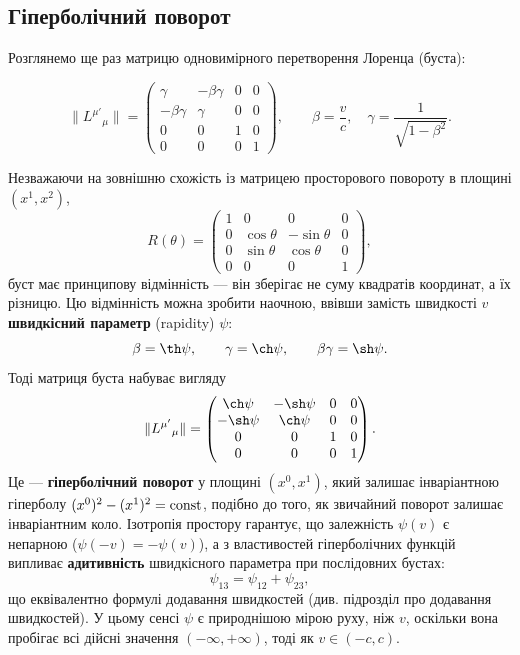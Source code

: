 \documentclass[%
biblatex,
]{ConspectBook}
\begin{document}
\subsection*{Гіперболічний поворот}
Розглянемо ще раз матрицю одновимірного перетворення Лоренца (буста):

\[
\|L^{\mu'}{}_{\mu}\| =
\begin{pmatrix}
\gamma & -\beta\gamma & 0 & 0 \\
-\beta\gamma & \gamma & 0 & 0 \\
0 & 0 & 1 & 0 \\
0 & 0 & 0 & 1
\end{pmatrix}, \qquad
\beta = \frac{v}{c},\quad \gamma = \frac{1}{\sqrt{1-\beta^2}}.
\]

Незважаючи на зовнішню схожість із матрицею просторового повороту в площині $(x^1, x^2)$,
\[
R(\theta) =
\begin{pmatrix}
1 & 0 & 0 & 0 \\
0 & \cos\theta & -\sin\theta & 0 \\
0 & \sin\theta & \cos\theta & 0 \\
0 & 0 & 0 & 1
\end{pmatrix},
\]
буст має принципову відмінність --- він зберігає не суму квадратів координат, а їх різницю.
Цю відмінність можна зробити наочною, ввівши замість швидкості $v$ \textbf{швидкісний параметр}
(rapidity) $\psi$:
\[
\beta = \th\psi, \qquad \gamma = \ch\psi, \qquad \beta\gamma = \sh\psi.
\]
Тоді матриця буста набуває вигляду
\begin{equation}
\|L^{\mu'}{}_{\mu}\| =
\begin{pmatrix}
\ch\psi & -\sh\psi & 0 & 0 \\
-\sh\psi &  \ch\psi & 0 & 0 \\
0 & 0 & 1 & 0 \\
0 & 0 & 0 & 1
\end{pmatrix}.
\label{eq:boost_hyperbolic}
\end{equation}
Це --- \textbf{гіперболічний поворот} у площині $(x^0, x^1)$, який залишає інваріантною
гіперболу $(x^0)^2 - (x^1)^2 = \operatorname{const}$, подібно до того, як звичайний поворот залишає
інваріантним коло. Ізотропія простору гарантує, що залежність $\psi(v)$ є непарною
($\psi(-v) = -\psi(v)$), а з властивостей гіперболічних функцій випливає
\textbf{адитивність} швидкісного параметра при послідовних бустах:
\[
\psi_{13} = \psi_{12} + \psi_{23},
\]
що еквівалентно формулі додавання швидкостей (див. підрозділ про додавання швидкостей).
У цьому сенсі $\psi$ є природнішою мірою руху, ніж $v$, оскільки вона пробігає всі дійсні
значення $(-\infty, +\infty)$, тоді як $v\in(-c,c)$.
\end{document}
